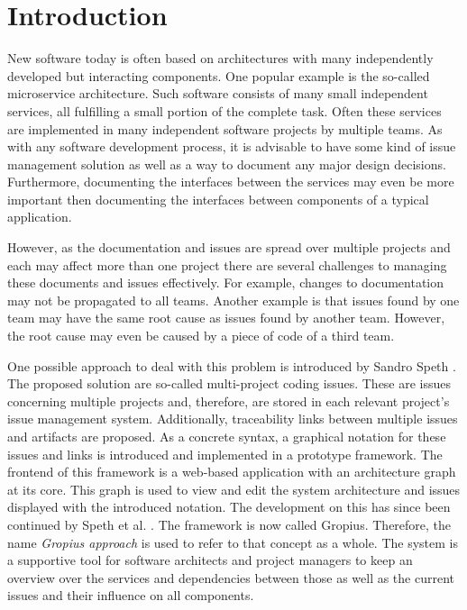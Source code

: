 
\chapter{Introduction}
\label{chap:ch1}
New software today is often based on architectures with many independently developed but interacting components.
One popular example is the so-called microservice architecture.
Such software consists of many small independent services, all fulfilling a small portion of the complete task.
Often these services are implemented in many independent software projects by multiple teams.
As with any software development process, it is advisable to have some kind of issue management solution 
as well as a way to document any major design decisions.
Furthermore, documenting the interfaces between the services may even be more important 
then documenting the interfaces between components of a typical application.

However, as the documentation and issues are spread over multiple projects
and each may affect more than one project there are several challenges to managing these documents and issues effectively.
For example, changes to documentation may not be propagated to all teams. 
Another example is that issues found by one team may have the same root cause as issues found by another team.
However, the root cause may even be caused by a piece of code of a third team.

One possible approach to deal with this problem is introduced by Sandro Speth \cite{Speth2019}.
The proposed solution are so-called multi-project coding issues. 
These are issues concerning multiple projects and, therefore, are stored in each relevant project's issue management system. 
Additionally, traceability links between multiple issues and artifacts are proposed.
As a concrete syntax, a graphical notation for these issues and links is introduced and implemented in a prototype framework. 
The frontend of this framework is a web-based application with an architecture graph at its core.
This graph is used to view and edit the system architecture and issues displayed with the introduced notation.
The development on this has since been continued by Speth et al. \cite{speth2020gropius}. The framework is now called \gls{Gropius}.
Therefore, the name \emph{\gls{Gropius} approach} is used to refer to that concept as a whole.
The system is a supportive tool for software architects and project managers to keep an overview over the services
and dependencies between those as well as the current issues and their influence on all components.

